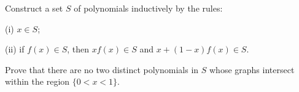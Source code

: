 Construct a set $S$ of polynomials inductively by the rules:

(i) $x\in S$;

(ii) if $f(x)\in S$,  then $xf(x)\in S$ and $x+(1-x)f(x)\in S$.

Prove that there are no two distinct polynomials in $S$ whose graphs intersect within the region $\{0 < x < 1\}$.